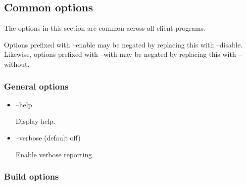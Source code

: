 \subsection{Common options\label{Common_options}}

The options in this section are common across all client programs.

Options prefixed with {\sf --enable} may be negated by replacing this with
{\sf --disable}. Likewise, options prefixed with {\sf --with} may be negated
by replacing this with {\sf --without}.

\subsubsection{General options}
\begin{itemize}
\item {\sf --help}

Display help.

\item {\sf --verbose} (default off)

Enable verbose reporting.
\end{itemize}

\subsubsection{Build options}

